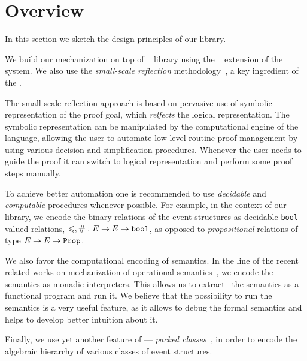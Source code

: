 \section{Overview}

In this section we sketch the design principles of our library. 

We build our mechanization on top of \mathcomp~\cite{Mahboubi-Tassi:MATHCOMP17} library 
using the \ssreflect~\cite{Gonthier-al:SSR2016} extension of the \coq system.
We also use the \emph{small-scale reflection} 
methodology~\cite{Gonthier-Assia:SSR2010, Gonthier-al:SSR2016}, 
a key ingredient of the \ssreflect. 

The small-scale reflection approach is based on 
pervasive use of symbolic representation of the proof goal, 
which \emph{relfects} the logical representation. 
The symbolic representation can be manipulated 
by the computational engine of the language, 
allowing the user to automate low-level routine 
proof management by using various decision 
and simplification procedures. 
Whenever the user needs to guide the proof 
it can switch to logical representation
and perform some proof steps manually. 

To achieve better automation one is recommended 
to use \emph{decidable} and \emph{computable} procedures
whenever possible.
For example, in the context of our library, 
we encode the binary relations of the event structures
as decidable \texttt{bool}-valued relations, 
\ie $\leqslant, \# : E \rightarrow E \rightarrow \texttt{bool}$,
as opposed to \emph{propositional} 
relations of type $E \rightarrow E \rightarrow \texttt{Prop}$. 

We also favor the computational encoding of semantics. 
In the line of the recent related works on mechanization 
of operational semantics~\cite{Xia-al:POPL2019, Letan-al:CPP2020, Affeldt-al:ICMPC2019}, 
we encode the semantics as monadic interpreters.  
This allows us to extract~\cite{Letouzey:CCE2008} 
the semantics as a functional program and run it. 
We believe that the possibility to run the semantics 
is a very useful feature, as it allows 
to debug the formal semantics
and helps to develop better intuition about it.

Finally, we use yet another feature of \mathcomp --- 
\emph{packed classes}~\cite{Garillot-al:ICTPHOL2009}, 
in order to encode the algebraic hierarchy
of various classes of event structures. 